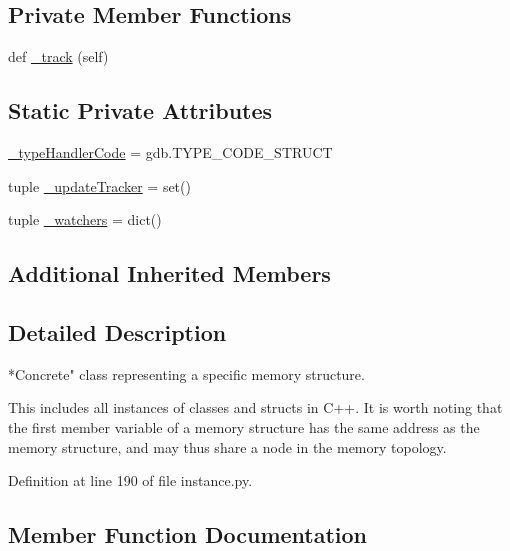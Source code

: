 \subsection*{Private Member Functions}
\begin{DoxyCompactItemize}
\item 
def \hyperlink{classmemoryoracle_1_1instance_1_1Structure_a200a54be462e0199b7833cbd11f81a52}{\+\_\+track} (self)
\end{DoxyCompactItemize}
\subsection*{Static Private Attributes}
\begin{DoxyCompactItemize}
\item 
\hyperlink{classmemoryoracle_1_1instance_1_1Structure_ad6d7eb43b40a67a235d23f2f018587f0}{\+\_\+type\+Handler\+Code} = gdb.\+T\+Y\+P\+E\+\_\+\+C\+O\+D\+E\+\_\+\+S\+T\+R\+U\+C\+T
\item 
tuple \hyperlink{classmemoryoracle_1_1instance_1_1Structure_ae63c5b3c5f79bf71f88a43325085d251}{\+\_\+update\+Tracker} = set()
\item 
tuple \hyperlink{classmemoryoracle_1_1instance_1_1Structure_a0b0148c77593c771c18b3f69eee9c3a9}{\+\_\+watchers} = dict()
\end{DoxyCompactItemize}
\subsection*{Additional Inherited Members}


\subsection{Detailed Description}
\begin{DoxyVerb}*Concrete" class representing a specific memory structure.

This includes all instances of classes and structs in C++.
It is worth noting that the first member variable of a
memory structure has the same address as the memory structure,
and may thus share a node in the memory topology.
\end{DoxyVerb}
 

Definition at line 190 of file instance.\+py.



\subsection{Member Function Documentation}
\hypertarget{classmemoryoracle_1_1instance_1_1Structure_a200a54be462e0199b7833cbd11f81a52}{}

